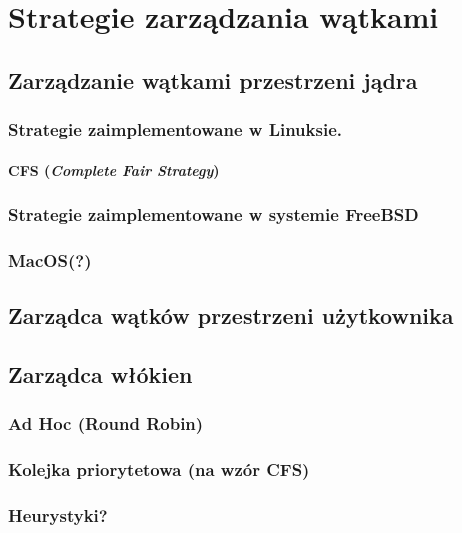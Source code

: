 \section{Strategie zarządzania wątkami}

\subsection{Zarządzanie wątkami przestrzeni jądra}

\subsubsection{Strategie zaimplementowane w Linuksie.}

\paragraph{CFS (\emph{Complete Fair Strategy})}

\subsubsection{Strategie zaimplementowane w systemie FreeBSD}

\subsubsection{MacOS(?)}

\subsection{Zarządca wątków przestrzeni użytkownika}

\subsection{Zarządca włókien}

\subsubsection{Ad Hoc (Round Robin)}

\subsubsection{Kolejka priorytetowa (na wzór CFS)}

\subsubsection{Heurystyki?}
